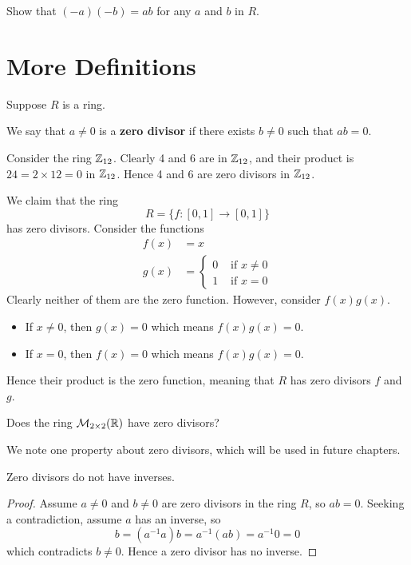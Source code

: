 \begin{exercise}\label{exercise-product-of-additive-inverses}
    Show that $(-a)(-b) = ab$ for any $a$ and $b$ in $R$.
\end{exercise}

\section{More Definitions}
Suppose $R$ is a ring.
\begin{definition}
    We say that $a \neq 0$ is a \textbf{zero divisor} if there exists $b \neq 0$ such that $ab = 0$.
\end{definition}
\begin{example}
    Consider the ring $\mathbb{Z}_{12}$. Clearly 4 and 6 are in $\mathbb{Z}_{12}$, and their product is $24 = 2 \times 12 = 0$ in $\mathbb{Z}_{12}$. Hence 4 and 6 are zero divisors in $\mathbb{Z}_{12}$.
\end{example}
\begin{example}
    We claim that the ring
    \[
        R = \{f: [0, 1] \to [0, 1]\}
    \]
    has zero divisors. Consider the functions
    \begin{align*}
        f(x) &= x\\
        g(x) &= \begin{cases}
            0 & \text{ if } x \neq 0\\
            1 & \text{ if } x = 0
        \end{cases}
    \end{align*}
    Clearly neither of them are the zero function. However, consider $f(x)g(x)$.
    \begin{itemize}
        \item If $x \neq 0$, then $g(x) = 0$ which means $f(x)g(x) = 0$.
        \item If $x = 0$, then $f(x) = 0$ which means $f(x)g(x) = 0$.
    \end{itemize}
    Hence their product is the zero function, meaning that $R$ has zero divisors $f$ and $g$.
\end{example}
\begin{exercise}
    Does the ring $\mathcal{M}_{2\times2}(\mathbb{R})$ have zero divisors?
\end{exercise}
We note one property about zero divisors, which will be used in future chapters.
\begin{proposition}\label{prop-zero-divisors-have-no-inverses}
    Zero divisors do not have inverses.
\end{proposition}
\begin{proof}
    Assume $a \neq 0$ and $b \neq 0$ are zero divisors in the ring $R$, so $ab = 0$. Seeking a contradiction, assume $a$ has an inverse, so
    \[
        b = (a^{-1}a)b = a^{-1}(ab) = a^{-1}0 = 0    
    \]
    which contradicts $b \neq 0$. Hence a zero divisor has no inverse.
\end{proof}


